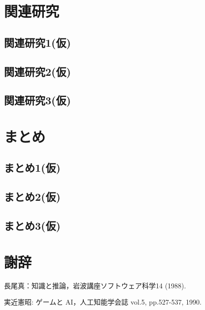 \section{関連研究}
\subsection{関連研究1(仮)}
\subsection{関連研究2(仮)}
\subsection{関連研究3(仮)}
\section{まとめ}
\subsection{まとめ1(仮)}
\subsection{まとめ2(仮)}
\subsection{まとめ3(仮)}
\section{謝辞}

\newpage 

\begin{thebibliography}{}

 長尾真：知識と推論，岩波講座ソフトウェア科学14 (1988). 

 実近憲昭: ゲームと AI，人工知能学会誌 vol.5, pp.527-537, 1990.

\end{thebibliography}


